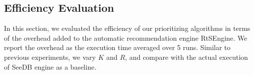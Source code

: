 \subsection{Efficiency Evaluation}
\label{sec:results_eff}
%
In this section, we evaluated the efficiency of our prioritizing algorithms in terms of the overhead added to the automatic recommendation engine RtSEngine.
%
We report the overhead as the execution time averaged over 5 runs.
%
%
Similar to previous experiments,  we vary $K$ and $R$, and compare with the actual execution of SeeDB engine as a baseline.
%
%
%

